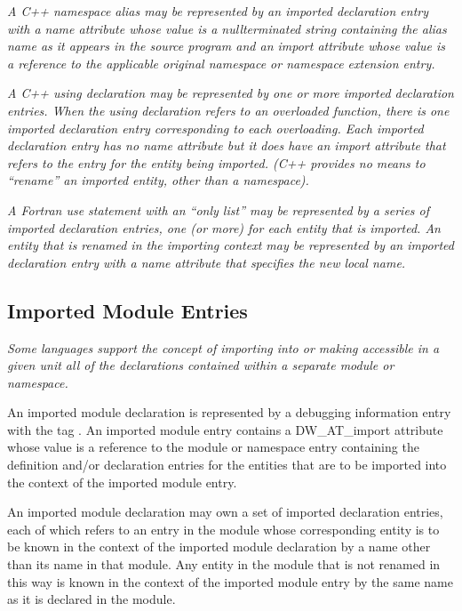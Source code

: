\textit{A C++ namespace alias may be represented by an imported
declaration entry with a name attribute whose value is
a null\dash terminated string containing the alias name as it
appears in the source program and an import attribute whose
value is a reference to the applicable original namespace or
namespace extension entry.
}

\textit{A C++ using declaration may be represented by one or more
imported declaration entries.  When the using declaration
refers to an overloaded function, there is one imported
declaration entry corresponding to each overloading. Each
imported declaration entry has no name attribute but it does
have an import attribute that refers to the entry for the
entity being imported. (C++ provides no means to ``rename''
an imported entity, other than a namespace).
}

\textit{A Fortran use statement with an ``only list'' may be
represented by a series of imported declaration entries,
one (or more) for each entity that is imported. An entity
that is renamed in the importing context may be represented
by an imported declaration entry with a name attribute that
specifies the new local name.
}

\subsection{Imported Module Entries}
\label{chap:importedmoduleentries}

\textit{Some languages support the concept of importing into or making
accessible in a given unit all of the declarations contained
within a separate module or namespace.
}

An imported module declaration is represented by a debugging
information entry with the 
tag .
An
imported module entry contains a DW\-\_AT\-\_import attribute
whose value is a reference to the module or namespace entry
containing the definition and/or declaration entries for
the entities that are to be imported into the context of the
imported module entry.

An imported module declaration may own a set of imported
declaration entries, each of which refers to an entry in the
module whose corresponding entity is to be known in the context
of the imported module declaration by a name other than its
name in that module. Any entity in the module that is not
renamed in this way is known in the context of the imported
module entry by the same name as it is declared in the module.

